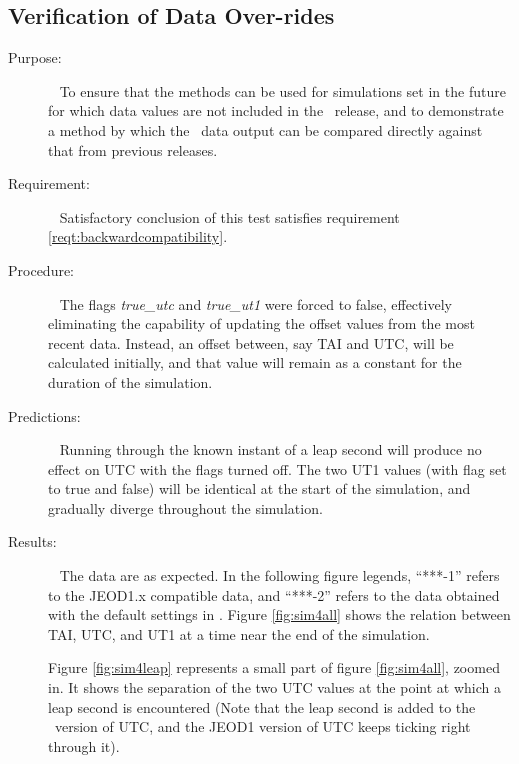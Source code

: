 \subsection{Verification of Data Over-rides}
  \label{test:overrides}
\begin{description}
\item[Purpose:]\ \newline
To ensure that the methods can be used for simulations set in the future for which data values are not included in the \JEODid\ release, and to demonstrate a method by which the \JEODid\ data output can be compared directly against that from previous releases.

\item[Requirement:]\ \newline
Satisfactory conclusion of this test satisfies requirement \ref{reqt:backwardcompatibility}.

\item[Procedure:]\ \newline
The flags \textit{true\_utc} and \textit{true\_ut1} were forced to false, effectively eliminating the capability of updating the offset values from the most recent data.  Instead, an offset between, say TAI and UTC, will be calculated initially, and that value will remain as a constant for the duration of the simulation.

\item[Predictions:]\ \newline
Running through the known instant of a leap second will produce no effect on UTC with the flags turned off.  The two UT1 values (with flag set to true and false) will be identical at the start of the simulation, and gradually diverge throughout the simulation.

\item[Results:]\ \newline
The data are as expected.
In the following figure legends, ``***-1'' refers to the JEOD1.x compatible
data, and ``***-2'' refers to the data obtained with the default settings in \JEODid.
Figure \ref{fig:sim4all} shows the relation between TAI, UTC, and UT1 at a time near the end of the simulation.

Figure \ref{fig:sim4leap} represents a small part of figure \ref{fig:sim4all}, zoomed in. It shows the separation of the two UTC values at the point at which a leap second is encountered (Note that the leap second is added to the \JEODid\ version of UTC, and the JEOD1 version of UTC keeps ticking right through it).


\end{description}
